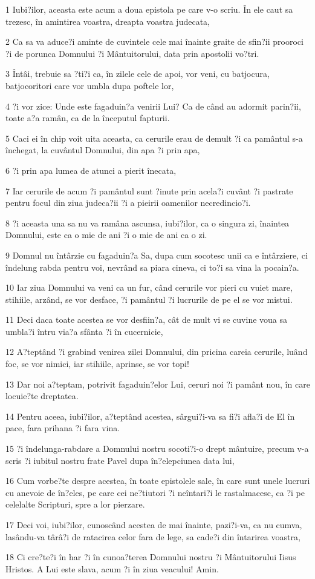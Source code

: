 \par 1 Iubi?ilor, aceasta este acum a doua epistola pe care v-o scriu. În ele caut sa trezesc, în amintirea voastra, dreapta voastra judecata,
\par 2 Ca sa va aduce?i aminte de cuvintele cele mai înainte graite de sfin?ii prooroci ?i de porunca Domnului ?i Mântuitorului, data prin apostolii vo?tri.
\par 3 Întâi, trebuie sa ?ti?i ca, în zilele cele de apoi, vor veni, cu batjocura, batjocoritori care vor umbla dupa poftele lor,
\par 4 ?i vor zice: Unde este fagaduin?a venirii Lui? Ca de când au adormit parin?ii, toate a?a ramân, ca de la începutul fapturii.
\par 5 Caci ei în chip voit uita aceasta, ca cerurile erau de demult ?i ca pamântul s-a închegat, la cuvântul Domnului, din apa ?i prin apa,
\par 6 ?i prin apa lumea de atunci a pierit înecata,
\par 7 Iar cerurile de acum ?i pamântul sunt ?inute prin acela?i cuvânt ?i pastrate pentru focul din ziua judeca?ii ?i a pieirii oamenilor necredincio?i.
\par 8 ?i aceasta una sa nu va ramâna ascunsa, iubi?ilor, ca o singura zi, înaintea Domnului, este ca o mie de ani ?i o mie de ani ca o zi.
\par 9 Domnul nu întârzie cu fagaduin?a Sa, dupa cum socotesc unii ca e întârziere, ci îndelung rabda pentru voi, nevrând sa piara cineva, ci to?i sa vina la pocain?a.
\par 10 Iar ziua Domnului va veni ca un fur, când cerurile vor pieri cu vuiet mare, stihiile, arzând, se vor desface, ?i pamântul ?i lucrurile de pe el se vor mistui.
\par 11 Deci daca toate acestea se vor desfiin?a, cât de mult vi se cuvine voua sa umbla?i întru via?a sfânta ?i în cucernicie,
\par 12 A?teptând ?i grabind venirea zilei Domnului, din pricina careia cerurile, luând foc, se vor nimici, iar stihiile, aprinse, se vor topi!
\par 13 Dar noi a?teptam, potrivit fagaduin?elor Lui, ceruri noi ?i pamânt nou, în care locuie?te dreptatea.
\par 14 Pentru aceea, iubi?ilor, a?teptând acestea, sârgui?i-va sa fi?i afla?i de El în pace, fara prihana ?i fara vina.
\par 15 ?i îndelunga-rabdare a Domnului nostru socoti?i-o drept mântuire, precum v-a scris ?i iubitul nostru frate Pavel dupa în?elepciunea data lui,
\par 16 Cum vorbe?te despre acestea, în toate epistolele sale, în care sunt unele lucruri cu anevoie de în?eles, pe care cei ne?tiutori ?i neîntari?i le rastalmacesc, ca ?i pe celelalte Scripturi, spre a lor pierzare.
\par 17 Deci voi, iubi?ilor, cunoscând acestea de mai înainte, pazi?i-va, ca nu cumva, lasându-va târâ?i de ratacirea celor fara de lege, sa cade?i din întarirea voastra,
\par 18 Ci cre?te?i în har ?i în cunoa?terea Domnului nostru ?i Mântuitorului Iisus Hristos. A Lui este slava, acum ?i în ziua veacului! Amin.


